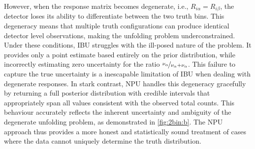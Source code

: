 However, when the response matrix becomes degenerate, i.e., $R_{i\alpha} = R_{i\beta}$, the detector loses its ability to differentiate between the two truth bins.
%
This degeneracy means that multiple truth configurations can produce identical detector level observations, making the unfolding problem underconstrained.
%
Under these conditions, IBU struggles with the ill-posed nature of the problem.
%
It provides only a point estimate based entirely on the prior distribution, while incorrectly estimating zero uncertainty for the ratio $\nicefrac{\nu_\alpha}{\nu_\alpha+\nu_\alpha}$.
%
This failure to capture the true uncertainty is a inescapable limitation of IBU when dealing with degenerate responses.
%
In stark contrast, NPU handles this degeneracy gracefully by returning a full posterior distribution with credible intervals that appropriately span all values consistent with the observed total counts.
%
This behaviour accurately reflects the inherent uncertainty and ambiguity of the degenerate unfolding problem, as demonstrated in \cref{fig:2bin:b}.
%
The NPU approach thus provides a more honest and statistically sound treatment of cases where the data cannot uniquely determine the truth distribution.

